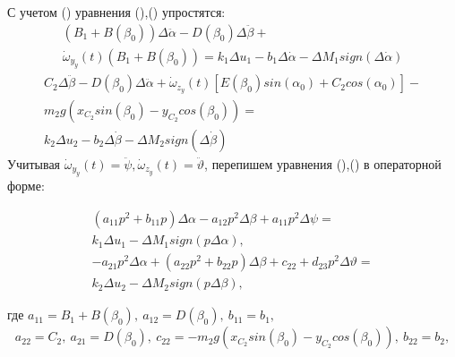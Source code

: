 С учетом () уравнения (),() упростятся: 
\begin{equation}
\label{eq:p3:57}
\begin{multlined}
\left( B_{1}+B \left( \beta _{0} \right) \right) \Delta \ddot \alpha -
D \left( \beta _{0} \right) \Delta \ddot \beta +\\
\dot \omega _{y_{y}} ( t ) ( B_{1}+B ( \beta_0 ) )
=
k_{1} \Delta u_{1} -
b_{1} \Delta \dot \alpha - 
\Delta M_{1}sign \left( \Delta \dot \alpha \right) 
\end{multlined}
\end{equation}
\begin{equation}
\label{eq:p3:58}
\begin{multlined}
C_{2} \Delta \ddot \beta -
D \left( \beta _{0} \right) \Delta \ddot \alpha +
\dot \omega _{z_{y}} \left( t \right) \left[ E \left( \beta_0 \right) sin \left( \alpha_0 \right) +C_{2}cos \left( \alpha_0 \right) \right]-\\
m_{2}g \left( x_{C_{2}}sin \left( \beta _{0} \right) -
y_{C_{2}}cos \left( \beta _{0} \right) \right) 
=\\
k_{2} \Delta u_{2}-
b_{2} \Delta \dot \beta - 
\Delta M_{2}sign \left( \Delta \dot \beta \right) 
\end{multlined}
\end{equation}
Учитывая $\dot \omega _{y_{y}} ( t ) = \ddot \psi, \dot \omega _{z_{y}} ( t ) = \ddot \vartheta$, перепишем уравнения (),() в операторной форме: 


\begin{equation}
\label{eq:p3:59}
\begin{multlined}
\left( a_{11}p^{2}+b_{11}p \right) \Delta \alpha -
a_{12}p^{2} \Delta \beta + 
a_{11} p^2 \Delta \psi 
=\\
k_{1} \Delta u_{1}- 
\Delta M_{1}sign \left( p \Delta \alpha \right),\\
-a_{21}p^{2} \Delta \alpha + 
\left( a_{22}p^{2}+b_{22}p \right) \Delta \beta +c_{22}+
 d_{23} p^2 \Delta \vartheta
=\\
k_{2} \Delta u_{2}- \Delta M_{2}sign \left( p \Delta \beta \right),
\end{multlined}
\end{equation}

где 
\( a_{11}=B_{1}+B \left( \beta _{0} \right), 
\ a_{12}=D \left( \beta _{0} \right), 
\ b_{11}=b_{1}, 
\) \[ a_{22}=C_{2}, 
\ a_{21}=D \left( \beta _{0} \right), 
\ c_{22}=-m_{2}g \left( x_{C_{2}}sin \left( \beta _{0} \right) -y_{C_{2}}cos \left( \beta _{0} \right) \right), \
 b_{22}=b_{2}, \] 

